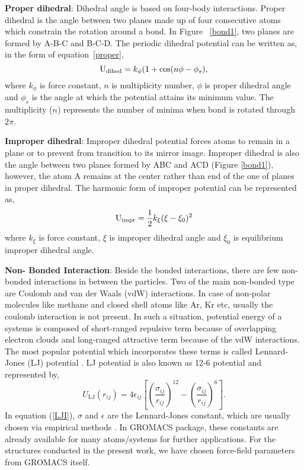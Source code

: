 {\bf Proper dihedral}: 
Dihedral angle is based on four-body interactions. Proper dihedral is the angle between two planes made up of four consecutive atoms which constrain the rotation around a bond. In Figure ~\ref{bond1}, two planes are formed by A-B-C and B-C-D. The periodic dihedral potential can be written as, in the form of equation~\ref{proper},
\begin{equation}\label{proper}
{\rm U}_{\rm dihed} = k_{\phi} (1 + \cos(n\phi - \phi_s),
\end{equation}
where $k_{\phi}$ is force constant, $n$ is multiplicity number, $\phi$ is proper dihedral angle and $\phi_s$ is the angle at which the potential attains its minimum value. The multiplicity ($n$) represents the number of minima when bond is rotated through $2\pi$. 

{\bf Improper dihedral}: Improper dihedral potential forces atoms to remain in a plane or to prevent from transition to its mirror image. Improper dihedral is also the angle between two planes formed by ABC and ACD (Figure \ref{bond1}), however, the atom A remains at the center rather than end of the one of planes in proper dihedral. The harmonic form of improper potential can be represented as,  
\begin{equation}
{\rm U}_{\rm impr} = \frac{1}{2} k_\xi (\xi - \xi_{0})^2 
\label{improper}
\end{equation}
where $k_\xi $ is force constant, $\xi$ is improper dihedral angle and $ \xi_0 $ is equilibrium improper dihedral angle. 

{\textbf{Non- Bonded Interaction}}: Beside the bonded interactions, there are few non-bonded interactions in between the particles. Two of the main non-bonded type are Coulomb and van der Waals (vdW) interactions. In case of non-polar molecules like methane and closed shell atoms like Ar, Kr etc, usually the coulomb interaction is not present. In such a situation, potential energy of a systems is composed of short-ranged repulsive term because of overlapping electron clouds and long-ranged attractive term because of the vdW interactions. The most popular potential which incorporates these terms is called Lennard-Jones (LJ) potential \citep{Kittel2005}. LJ potential is also known as 12-6 potential and represented by,
\begin{equation}
U_{\text{LJ}}(r_{ij}) = 4\epsilon_{ij}\left[\left(\frac{\sigma_{ij}}{r_{ij}}\right)^{12} - \left(\frac{\sigma_{ij}}{r_{ij}}\right)^6\right].
\label{LJI}
\end{equation}
In equation (\ref{LJI}), $\sigma$ and $\epsilon$ are the Lennard-Jones constant, which are usually chosen via empirical methods \citep{Ercolessi1997}. In GROMACS package, these constants are already available for many atoms/systems for further applications. For the structures conducted in the present work, we have chosen force-field parameters from GROMACS itself. 

